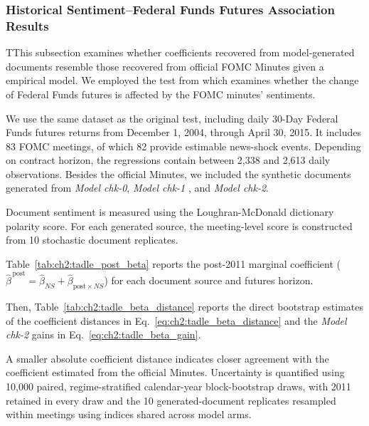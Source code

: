 


\subsubsection*{Historical Sentiment--Federal Funds Futures Association Results}

TThis subsection examines whether coefficients recovered from model-generated documents resemble those recovered from official FOMC Minutes given a empirical model. We employed the test from \citet{tadle2022fomc} which examines whether the change of Federal Funds futures is affected by the FOMC minutes' sentiments. 


We use the same dataset as the original test, including daily 30-Day Federal Funds futures returns from December 1, 2004, through April 30, 2015. It includes 83 FOMC meetings, of which 82 provide estimable news-shock events. Depending on contract horizon, the regressions contain between 2,338 and 2,613 daily observations. Besides the official Minutes, we included the synthetic documents generated from \textit{Model chk-0}, \textit{Model chk-1} , and \textit{Model chk-2}.

Document sentiment is measured using the Loughran-McDonald dictionary polarity score. For each generated source, the meeting-level score is constructed from 10 stochastic document replicates. 


Table~\ref{tab:ch2:tadle_post_beta} reports the post-2011 marginal coefficient ($\widehat{\beta}^{\,\mathrm{post}} = \widehat{\beta}_{NS} + \widehat{\beta}_{\mathrm{post}\times NS}$) for each document source and futures horizon.


Then, Table~\ref{tab:ch2:tadle_beta_distance} reports the direct
bootstrap estimates of the coefficient distances in
Eq.~\ref{eq:ch2:tadle_beta_distance} and the \textit{Model chk-2} gains in
Eq.~\ref{eq:ch2:tadle_beta_gain}.


A smaller absolute coefficient distance indicates closer agreement with the coefficient estimated from the official Minutes. Uncertainty is quantified using 10,000 paired, regime-stratified calendar-year block-bootstrap draws, with 2011 retained in every draw and the 10 generated-document replicates resampled within meetings using indices shared across model arms.



